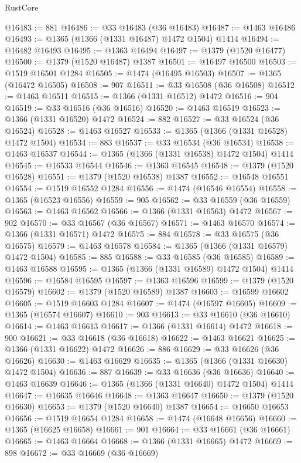 \begin{lexlean}{RustCore}
\begin{coremodule}
@16483 := 881
@16486 := @33 @16483 (@36 @16483)
@16487 := @1463 @16486
@16493 := @1365 (@1366 (@1331 @16487) @1472 @1504) @1414
@16494 := @16482 @16493
@16495 := @1363 @16494
@16497 := @1379 (@1520 @16477)
@16500 := @1379 (@1520 @16487) @1387
@16501 := @16497 @16500
@16503 := @1519 @16501 @1284
@16505 := @1474 (@16495 @16503)
@16507 := @1365 (@16472 @16505)
@16508 := 907
@16511 := @33 @16508 (@36 @16508)
@16512 := @1463 @16511
@16515 := @1366 (@1331 @16512) @1472
@16516 := 904
@16519 := @33 @16516 (@36 @16516)
@16520 := @1463 @16519
@16523 := @1366 (@1331 @16520) @1472
@16524 := 882
@16527 := @33 @16524 (@36 @16524)
@16528 := @1463 @16527
@16533 := @1365 (@1366 (@1331 @16528) @1472 @1504)
@16534 := 883
@16537 := @33 @16534 (@36 @16534)
@16538 := @1463 @16537
@16544 := @1365 (@1366 (@1331 @16538) @1472 @1504) @1414
@16545 := @16533 @16544
@16546 := @1363 @16545
@16548 := @1379 (@1520 @16528)
@16551 := @1379 (@1520 @16538) @1387
@16552 := @16548 @16551
@16554 := @1519 @16552 @1284
@16556 := @1474 (@16546 @16554)
@16558 := @1365 (@16523 @16556)
@16559 := 905
@16562 := @33 @16559 (@36 @16559)
@16563 := @1463 @16562
@16566 := @1366 (@1331 @16563) @1472
@16567 := 902
@16570 := @33 @16567 (@36 @16567)
@16571 := @1463 @16570
@16574 := @1366 (@1331 @16571) @1472
@16575 := 884
@16578 := @33 @16575 (@36 @16575)
@16579 := @1463 @16578
@16584 := @1365 (@1366 (@1331 @16579) @1472 @1504)
@16585 := 885
@16588 := @33 @16585 (@36 @16585)
@16589 := @1463 @16588
@16595 := @1365 (@1366 (@1331 @16589) @1472 @1504) @1414
@16596 := @16584 @16595
@16597 := @1363 @16596
@16599 := @1379 (@1520 @16579)
@16602 := @1379 (@1520 @16589) @1387
@16603 := @16599 @16602
@16605 := @1519 @16603 @1284
@16607 := @1474 (@16597 @16605)
@16609 := @1365 (@16574 @16607)
@16610 := 903
@16613 := @33 @16610 (@36 @16610)
@16614 := @1463 @16613
@16617 := @1366 (@1331 @16614) @1472
@16618 := 900
@16621 := @33 @16618 (@36 @16618)
@16622 := @1463 @16621
@16625 := @1366 (@1331 @16622) @1472
@16626 := 886
@16629 := @33 @16626 (@36 @16626)
@16630 := @1463 @16629
@16635 := @1365 (@1366 (@1331 @16630) @1472 @1504)
@16636 := 887
@16639 := @33 @16636 (@36 @16636)
@16640 := @1463 @16639
@16646 := @1365 (@1366 (@1331 @16640) @1472 @1504) @1414
@16647 := @16635 @16646
@16648 := @1363 @16647
@16650 := @1379 (@1520 @16630)
@16653 := @1379 (@1520 @16640) @1387
@16654 := @16650 @16653
@16656 := @1519 @16654 @1284
@16658 := @1474 (@16648 @16656)
@16660 := @1365 (@16625 @16658)
@16661 := 901
@16664 := @33 @16661 (@36 @16661)
@16665 := @1463 @16664
@16668 := @1366 (@1331 @16665) @1472
@16669 := 898
@16672 := @33 @16669 (@36 @16669)

\end{coremodule}
\end{lexlean}
